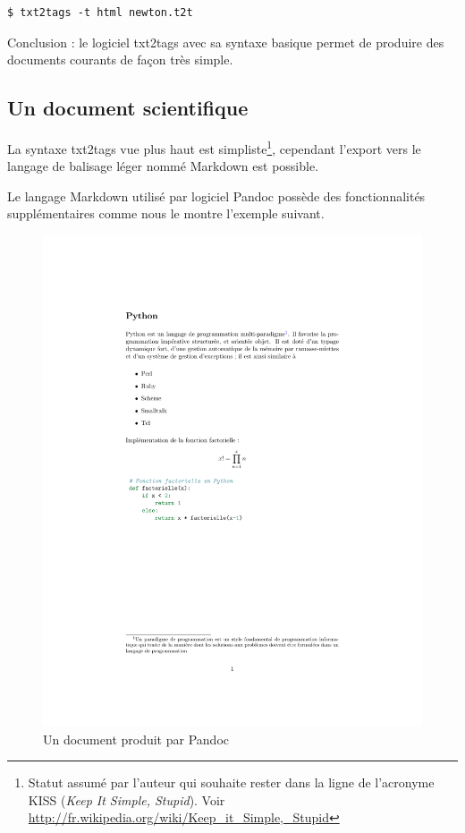 \documentclass[]{article}
\makeatletter
\def\maxwidth{\ifdim\Gin@nat@width>\linewidth\linewidth
\else\Gin@nat@width\fi}
\let\Oldincludegraphics\includegraphics
\renewcommand{\includegraphics}[1]{\Oldincludegraphics[width=\maxwidth]{#1}}
\makeatother
\begin{document}
\begin{verbatim}
$ txt2tags -t html newton.t2t
\end{verbatim}
Conclusion : le logiciel txt2tags avec sa syntaxe basique permet de
produire des documents courants de façon très simple.

\subsection{Un document scientifique}

La syntaxe txt2tags vue plus haut est simpliste\footnote{Statut assumé
  par l'auteur qui souhaite rester dans la ligne de l'acronyme KISS
  (\emph{Keep It Simple, Stupid}). Voir
  \url{http://fr.wikipedia.org/wiki/Keep_it_Simple,_Stupid}}, cependant
l'export vers le langage de balisage léger nommé Markdown est possible.

Le langage Markdown utilisé par logiciel Pandoc possède des
fonctionnalités supplémentaires comme nous le montre l'exemple suivant.

\begin{figure}[htbp]
\centering
\includegraphics{python.pdf}
\caption{Un document produit par Pandoc}
\end{figure}
\end{document}
